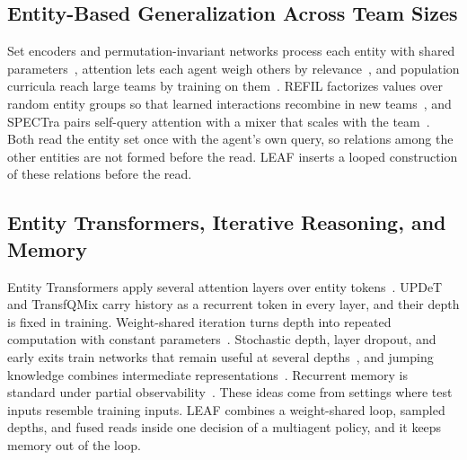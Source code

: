 \subsection{Entity-Based Generalization Across Team Sizes}
\label{subsec:rw-entity}
Set encoders and permutation-invariant networks process each entity with shared parameters~\cite{zaheer2017deepsets,lee2019settransformer,hao2023hpn}, attention lets each agent weigh others by relevance~\cite{iqbal2019maac}, and population curricula reach large teams by training on them~\cite{long2020epc,wang2020dymacl}. REFIL factorizes values over random entity groups so that learned interactions recombine in new teams~\cite{iqbal2021refil}, and SPECTra pairs self-query attention with a mixer that scales with the team~\cite{park2026spectra}. Both read the entity set once with the agent's own query, so relations among the other entities are not formed before the read. LEAF inserts a looped construction of these relations before the read.

\subsection{Entity Transformers, Iterative Reasoning, and Memory}
\label{subsec:rw-transformer}
Entity Transformers apply several attention layers over entity tokens~\cite{hu2021updet,transfqmix2023}. UPDeT and TransfQMix carry history as a recurrent token in every layer, and their depth is fixed in training. Weight-shared iteration turns depth into repeated computation with constant parameters~\cite{dehghani2019universal,graves2016act,giannou2023looped}. Stochastic depth, layer dropout, and early exits train networks that remain useful at several depths~\cite{huang2016stochastic,fan2020layerdrop,teerapittayanon2016branchynet,kaya2019overthinking}, and jumping knowledge combines intermediate representations~\cite{xu2018jk}. Recurrent memory is standard under partial observability~\cite{hausknecht2015drqn,phan2023aerial}. These ideas come from settings where test inputs resemble training inputs. LEAF combines a weight-shared loop, sampled depths, and fused reads inside one decision of a multiagent policy, and it keeps memory out of the loop.
